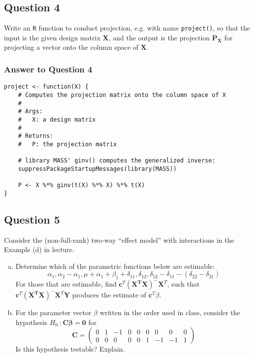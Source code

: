 \documentclass[paper=a4, fontsize=11pt]{scrartcl} %
\begin{document}
\subsection*{Question 4}

Write an \texttt{R} function to conduct projection, e.g. with name \texttt{project()}, so 
that the input is the given design matrix $\mathbf{X}$, and the output is the projection
$\mathbf{P}_{\mathbf{X}}$ for projecting a vector onto the column space of $\mathbf{X}$.

\bigskip
\subsubsection*{Answer to Question 4}
\begin{lstlisting}[basicstyle=\ttfamily\small\bfseries]
project <- function(X) {
    # Computes the projection matrix onto the column space of X
    #
    # Args:
    #   X: a design matrix
    #
    # Returns:
    #   P: the projection matrix
    
    # library MASS' ginv() computes the generalized inverse:
    suppressPackageStartupMessages(library(MASS)) 
    
    P <- X %*% ginv(t(X) %*% X) %*% t(X)
}
\end{lstlisting}
\bigskip
\bigskip

\pagebreak

\subsection*{Question 5}

Consider the (non-full-rank) two-way ``effect model''  with interactions in the Example (d) 
in lecture. 
\begin{enumerate}[(a)]
\item Determine which of the parametric functions below are estimable:
$$
\alpha_1, \alpha_2 - \alpha_1, \mu + \alpha_1 + \beta_1 + \delta_{11}, \delta_{12},  \delta_{12} - \delta_{11} - (\delta_{22} -  \delta_{21})
$$
For those that are estimable, find $\mathbf{c}^T (\mathbf{X^T} \mathbf{X} )^- \mathbf{X}^T$, 
such that $\mathbf{c}^T (\mathbf{X^T} \mathbf{X} )^- \mathbf{X}^T \mathbf{Y}$ 
produces the estimate of $\mathbf{c}^T \beta$.

\item For the parameter vector $\beta$ written in the order used in class, consider the hypothesis $H_0 \ : \mathbf{C} \mathbf{\beta} = \mathbf{0}$ for
$$
\mathbf{C} = 
\left( \begin{array}{ccccccccc}
  0 & 1 & -1 & 0 & 0 & 0 & 0 & 0 & 0\\
  0 & 0 & 0 & 0 & 0 & 1 & -1 & -1 & 1
\end{array} \right)
$$
Is this hypothesis testable? Explain.
\end{enumerate}
\end{document}
